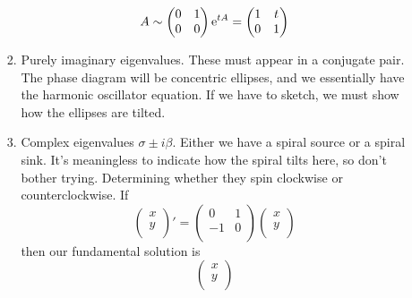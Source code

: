 \documentclass[../notes.tex]{subfiles}
\begin{document}
\begin{itemize}
\begin{itemize}
\begin{enumerate}
            \begin{equation*}
                A\sim
                \begin{pmatrix}
                    0 & 1\\
                    0 & 0\\
                \end{pmatrix}
                \e[tA] =
                \begin{pmatrix}
                    1 & t\\
                    0 & 1\\
                \end{pmatrix}
            \end{equation*}
            \item Purely imaginary eigenvalues. These must appear in a conjugate pair. The phase diagram will be concentric ellipses, and we essentially have the harmonic oscillator equation. If we have to sketch, we must show how the ellipses are tilted.
            \item Complex eigenvalues $\sigma\pm i\beta$. Either we have a spiral source or a spiral sink. It's meaningless to indicate how the spiral tilts here, so don't bother trying. Determining whether they spin clockwise or counterclockwise. If
            \begin{equation*}
                \begin{pmatrix}
                    x\\
                    y\\
                \end{pmatrix}'
                =
                \begin{pmatrix}
                    0 & 1\\
                    -1 & 0\\
                \end{pmatrix}
                \begin{pmatrix}
                    x\\
                    y\\
                \end{pmatrix}
            \end{equation*}
            then our fundamental solution is
            \begin{equation*}
                \begin{pmatrix}
                    x\\
                    y\\

\end{pmatrix}
\end{equation*}
\end{enumerate}
\end{itemize}
\end{itemize}
\end{document}
